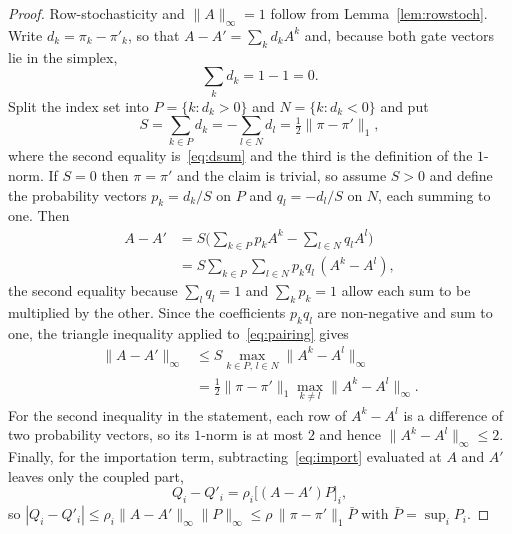 \documentclass[conference]{IEEEtran}
\begin{document}
\begin{proof}
Row-stochasticity and $\|A\|_\infty=1$ follow from Lemma~\ref{lem:rowstoch}. Write $d_k=\pi_k-\pi'_k$, so that $A-A'=\sum_k d_k A^k$ and, because both gate vectors lie in the simplex,
\begin{equation}
\textstyle\sum_k d_k = 1-1 = 0 .
\label{eq:dsum}
\end{equation}
Split the index set into $P=\{k: d_k>0\}$ and $N=\{k: d_k<0\}$ and put
\begin{equation}
S=\textstyle\sum_{k\in P} d_k = -\sum_{l\in N} d_l = \tfrac12\|\pi-\pi'\|_1 ,
\label{eq:S}
\end{equation}
where the second equality is~\eqref{eq:dsum} and the third is the definition of the $1$-norm. If $S=0$ then $\pi=\pi'$ and the claim is trivial, so assume $S>0$ and define the probability vectors $p_k=d_k/S$ on $P$ and $q_l=-d_l/S$ on $N$, each summing to one. Then
\begin{equation}
\begin{aligned}
A-A' &= S\Big(\sum_{k\in P} p_k A^k - \sum_{l\in N} q_l A^l\Big)\\[2pt]
&= S\!\!\sum_{k\in P}\sum_{l\in N}\!\! p_k q_l\,(A^k-A^l),
\end{aligned}
\label{eq:pairing}
\end{equation}
the second equality because $\sum_l q_l=1$ and $\sum_k p_k=1$ allow each sum to be multiplied by the other. Since the coefficients $p_kq_l$ are non-negative and sum to one, the triangle inequality applied to~\eqref{eq:pairing} gives
\begin{equation}
\begin{aligned}
\|A-A'\|_\infty &\le S\max_{k\in P,\,l\in N}\|A^k-A^l\|_\infty\\[2pt]
&= \tfrac12\|\pi-\pi'\|_1\max_{k\neq l}\|A^k-A^l\|_\infty .
\end{aligned}
\end{equation}
For the second inequality in the statement, each row of $A^k-A^l$ is a difference of two probability vectors, so its $1$-norm is at most $2$ and hence $\|A^k-A^l\|_\infty\le2$. Finally, for the importation term, subtracting~\eqref{eq:import} evaluated at $A$ and $A'$ leaves only the coupled part,
\begin{equation}
Q_i-Q'_i=\rho_i\big[(A-A')P\big]_i ,
\end{equation}
so $|Q_i-Q'_i|\le\rho_i\|A-A'\|_\infty\|P\|_\infty\le\rho\,\|\pi-\pi'\|_1\bar P$ with $\bar P=\sup_i P_i$.
\end{proof}
\end{document}
